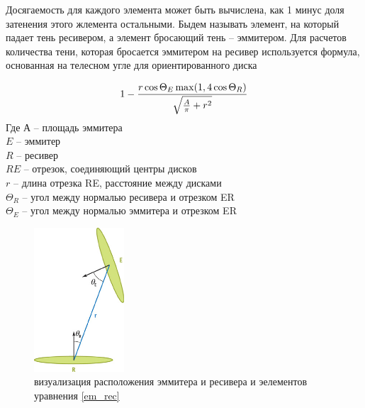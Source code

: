 Досягаемость для каждого элемента может быть вычислена, как 1 минус доля затенения этого жлемента остальными. Быдем называть элемент, на который падает тень ресивером, а элемент бросающий тень  -- эммитером. Для расчетов количества тени, которая бросается эммитером на ресивер используется формула, основанная на телесном угле для ориентированного диска 


\begin{equation}
	1-{{r\cos{\Theta_E \max(1, 4\cos{\Theta_R})}}\over{\sqrt{{A\over\pi} + r^2}}}
	\label{em_rec}
\end{equation}
Где $А$ -- площадь эммитера\\
$E$ -- эммитер\\
$R$ -- ресивер\\
$RE$ -- отрезок, соединяющий центры дисков\\
$r$ -- длина отрезка RE, расстояние между дисками\\
$\Theta_R$ -- угол между нормалью ресивера и отрезком ER\\
$\Theta_E$ -- угол между нормалью эммитера и отрезком ER\\

\begin{figure}[h]
	\center
	\includegraphics[width=0.3\textwidth]{14_ambient_occlusion_03}
	\caption{визуализация расположения эммитера и ресивера и эелементов уравнения \ref{em_rec}}\label{fig:ao03}
\end{figure}



